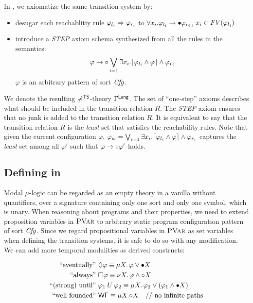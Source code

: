 \documentclass{almostllncs}
\begin{document}
In \mmul, we axiomatize the same transition system by:
\vspace*{-1ex}
\begin{itemize}
\item desugar each reachablitiy rule $\varphi_{l_i} \Rightarrow \varphi_{r_i}$ to 
	  $\forall x_i \mathord{.} \varphi_{l_i} \to {\bullet} \varphi_{r_i}$, $x_i \in \mathit{FV}(\varphi_{l_i})$
\item introduce a \emph{STEP} axiom schema synthesized from all the rules in the semantics: 
\begin{align*}
\varphi \to {\circ} \bigvee_{i=1} \exists x_i \mathord{.} \lceil\varphi_{l_i} \wedge \varphi\rceil \wedge \varphi_{r_i}
\end{align*}
$\varphi$ is an arbitrary pattern of sort $\mathit{Cfg}$.
\end{itemize}
We denote the resulting $\mathbb{\Sigma}^{\textnormal{\textsf{TS}}}$-theory $\Gamma^{\textnormal{\textsf{Lang}}}$.
The set of ``one-step'' axioms describes what should be included in the transition relation $R$.
The \emph{STEP} axiom ensures that no junk is added to the transition relation $R$.
It is equivalent to say that the transition relation $R$ is the \emph{least} set that satisfies the reachability rules.
Note that given the current configuration $\varphi$, $\varphi_w = \bigvee_{i=1} \exists x_i \mathord{.} \lceil\varphi_{l_i} \wedge \varphi\rceil \wedge \varphi_{r_i}$ captures the \emph{least} set among all $\varphi'$ such that $\varphi \to {\circ} \varphi'$ holds.

\subsection{Defining \ModmuL in \MmuL} \label{subsec: defining_modmul}

Modal $\mu$-logic can be regarded as an empty theory in a vanilla \mmul without quantifiers, over a signature containing only one sort and only one symbol, which is unary.
When reasoning about programs and their properties, we need to extend proposition variables in ${\normalfont\textsc{PVar}}$ to arbitrary static program configuration pattern of sort \emph{$\mathit{Cfg}$}.
Since we regard propositional variables in ${\normalfont\textsc{PVar}}$ as \mmul set variables when defining the transition systems, it is safe to do so with any modification.
We can add more temporal modalities as derived constructs:

\vspace*{-3ex}
\begin{align*}
\text{``eventually''} &\ 
\eventually \varphi \equiv \mu X \ldot\, \varphi \vee \snext X
\\
\text{``always''} &\ 
\always \varphi \equiv \nu X \ldot\, \varphi \wedge \wnext X
\\
\text{``(strong) until''}  &\ 
\varphi_1 \until \varphi_2 \equiv 
\mu X \ldot\, \varphi_2 \vee (\varphi_1 \wedge \snext X)
\\
\text{``well-founded''} &\
\wellfounded \equiv \mu X \ldot \wnext X
\quad\text{\doubleslash no infinite paths}
\end{align*}
\vspace*{-5ex}
\end{document}
